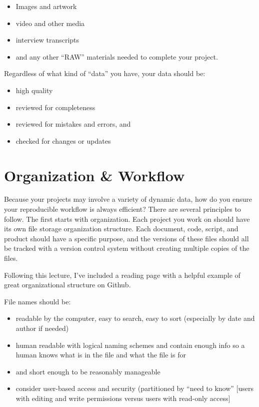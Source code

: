 \documentclass[
]{book}
\providecommand{\tightlist}{%
  \setlength{\itemsep}{0pt}\setlength{\parskip}{0pt}}
\begin{document}
\begin{itemize}
\tightlist
\item
  Images and artwork
\item
  video and other media
\item
  interview transcripts
\item
  and any other ``RAW'' materials needed to complete your project.
\end{itemize}

Regardless of what kind of ``data'' you have, your data should be:

\begin{itemize}
\tightlist
\item
  high quality
\item
  reviewed for completeness
\item
  reviewed for mistakes and errors, and
\item
  checked for changes or updates
\end{itemize}

\hypertarget{organization-workflow}{%
\section{Organization \& Workflow}\label{organization-workflow}}

Because your projects may involve a variety of dynamic data, how do you ensure your reproducible workflow is always efficient? There are several principles to follow. The first starts with organization. Each project you work on should have its own file storage organization structure. Each document, code, script, and product should have a specific purpose, and the versions of these files should all be tracked with a version control system without creating multiple copies of the files.

Following this lecture, I've included a reading page with a helpful example of great organizational structure on Github.

File names should be:

\begin{itemize}
\tightlist
\item
  readable by the computer, easy to search, easy to sort (especially by date and author if needed)
\item
  human readable with logical naming schemes and contain enough info so a human knows what is in the file and what the file is for
\item
  and short enough to be reasonably manageable
\item
  consider user-based access and security (partitioned by ``need to know'' {[}users with editing and write permissions versus users with read-only access{]}
\end{itemize}
\end{document}
